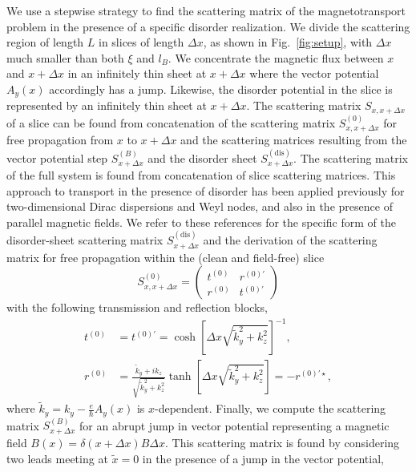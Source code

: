 \documentclass[aps,prb,10pt,amsmath,amssymb,twocolumn,floatfix,superscriptaddress,showpacs,numerical,footinbib]{revtex4-1}
\begin{document}
We use a stepwise strategy to find the scattering matrix of the magnetotransport problem in the presence of a specific disorder realization.
%
We divide the scattering region of length $L$ in slices of length $\Delta x$, as shown in Fig.~\ref{fig:setup}, with $\Delta x$ much smaller than both $\xi$ and $l_B$.
%
We concentrate the magnetic flux between $x$ and $x+\Delta x$ in an infinitely thin sheet at $x+\Delta x$ where the vector potential $A_y(x)$ accordingly has a jump.
%
Likewise, the disorder potential in the slice is represented by an infinitely thin sheet at $x+\Delta x$. The scattering matrix $S_{x,x+\Delta x}$ of a slice can be found from concatenation of the scattering matrix $S_{x,x+\Delta x}^{(0)}$ for free propagation from $x$ to $x+\Delta x$ and the scattering matrices resulting from the vector potential step $S_{x+\Delta x}^{(B)}$ and the disorder sheet $S_{x+\Delta x}^{(\mathrm{dis})}$. The scattering matrix of the full system is found from concatenation of slice scattering matrices.
This approach to transport in the presence of disorder has been applied previously for two-dimensional Dirac dispersions\cite{Bardarson2007} and Weyl nodes,\cite{Sbierski2014a} and also in the presence of parallel magnetic fields.\cite{Behrends2017}
We refer to these references for the specific form of the disorder-sheet scattering matrix $S_{x+\Delta x}^{(\mathrm{dis})}$ and the derivation of the scattering matrix for free propagation within
the (clean and field-free) slice
\begin{equation}
S_{x,x+\Delta x}^{(0)}=\left(\begin{array}{cc}
t^{(0)} & r^{(0)\prime}\\
r^{(0)} & t^{(0)\prime}
\end{array}\right)
\end{equation}
with the following transmission and reflection blocks,
\begin{align}
t^{(0)}&=t^{(0)\prime}=\cosh[\Delta x\sqrt{\tilde{k}_{y}^{2}+k_{z}^{2}}]^{-1},\\
r^{(0)}&=\frac{\tilde{k}_{y}+ik_{z}}{\sqrt{\tilde{k}_{y}^{2}+k_{z}^{2}}}\tanh\left[\Delta x\sqrt{\tilde{k}_{y}^{2}+k_{z}^{2}}\right]=-r^{(0)\prime\star},
\end{align}
where $\tilde{k}_{y}=k_{y}-\frac{e}{\hbar}A_y(x)$ is $x$-dependent.
Finally, we compute the scattering matrix $S_{x+\Delta x}^{(B)}$ for an abrupt jump in vector
potential representing a magnetic field $B(x)=\delta(x+\Delta x) B \Delta x$.
This scattering matrix is found by considering two leads meeting at
$\tilde{x}=0$ in the presence of a jump in the vector potential,
\end{document}
